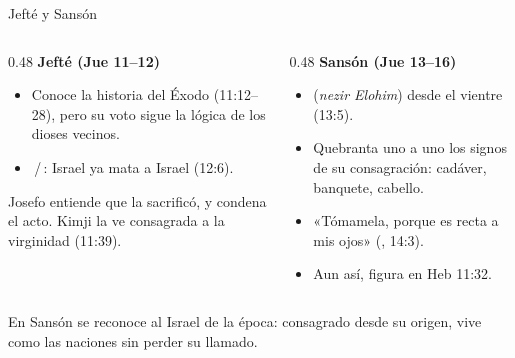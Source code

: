 \begin{frame}{Jefté y Sansón}
\begin{columns}[T,onlytextwidth]
\begin{column}{0.48\textwidth}\footnotesize
\textbf{\textcolor{cafe}{Jefté (Jue 11--12)}}
\begin{itemize}
\item Conoce la historia del Éxodo (11:12--28), pero su voto sigue la lógica de los dioses vecinos.
\item {}\,/\,: Israel ya mata a Israel (12:6).
\end{itemize}
\begin{notalam}
Josefo entiende que la sacrificó, y condena el acto. Kimji la ve consagrada a la virginidad (11:39).
\end{notalam}
\end{column}
\begin{column}{0.48\textwidth}\footnotesize
\textbf{\textcolor{cafe}{Sansón (Jue 13--16)}}
\begin{itemize}
\item {} (\emph{nezir Elohim}) desde el vientre (13:5).
\item Quebranta uno a uno los signos de su consagración: cadáver, banquete, cabello.
\item «Tómamela, porque es recta a mis ojos» (, 14:3).
\item Aun así, figura en Heb 11:32.
\end{itemize}
\end{column}
\end{columns}
\vspace{6pt}
\begin{clave}
En Sansón se reconoce al Israel de la época: consagrado desde su origen, vive como las naciones sin perder su llamado.
\end{clave}
\end{frame}

